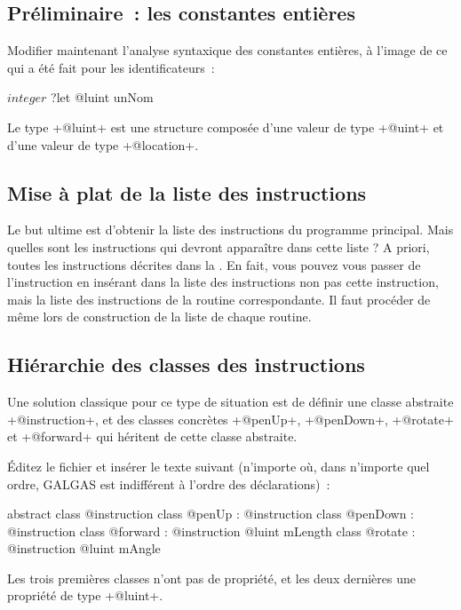\subsection{Préliminaire~: les constantes entières}

Modifier maintenant l’analyse syntaxique des constantes entières, à l’image de ce qui a été fait pour les identificateurs~:
\begin{galgas3}
$integer$ ?let @luint unNom
\end{galgas3}

Le type \ggst+@luint+ est une structure composée d’une valeur de type \ggst+@uint+ et d’une valeur de type \ggst+@location+.

\subsection{Mise à plat de la liste des instructions}
Le but ultime est d'obtenir la liste des instructions du programme principal. Mais quelles sont les instructions qui devront apparaître dans cette liste ? A priori, toutes les instructions décrites dans la . En fait, vous pouvez vous passer de l'instruction  en insérant dans la liste des instructions non pas cette instruction, mais la liste des instructions de la routine correspondante. Il faut procéder de même lors de construction de la liste de chaque routine.

\subsection{Hiérarchie des classes des instructions}
Une solution classique pour ce type de situation est de définir une classe abstraite \ggst+@instruction+, et des classes concrètes \ggst+@penUp+, \ggst+@penDown+, \ggst+@rotate+ et \ggst+@forward+ qui héritent de cette classe abstraite.

Éditez le fichier  et insérer le texte suivant (n’importe où, dans n’importe quel ordre, GALGAS est indifférent à l’ordre des déclarations)~:

\begin{galgas3}
abstract class @instruction {
}
class @penUp : @instruction {
}
class @penDown : @instruction {
}
class @forward : @instruction {
  @luint mLength
}
class @rotate : @instruction {
  @luint mAngle
}
\end{galgas3}


Les trois premières classes n'ont pas de propriété, et les deux dernières une propriété de type \ggst+@luint+.

